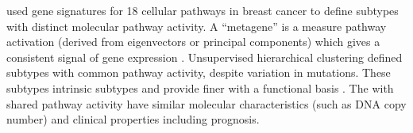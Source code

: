 \citet{Gatza2010} used gene signatures for 18 cellular \glspl{pathway} in breast cancer to define subtypes with distinct molecular \gls{pathway} activity. 
A ``\gls{metagene}'' is a measure \gls{pathway} activation (derived from eigenvectors or principal components) which gives a consistent signal of \gls{gene expression} \citep{Huang2003, Anjomshoaa2008, Nagalla2013}. %
Unsupervised hierarchical clustering defined subtypes with common \gls{pathway} activity, despite variation in \glspl{mutation}. These subtypes \glspl{intrinsic subtype} and provide finer  with a functional basis \citep{Parker2009, Gatza2014}. The  with shared \gls{pathway} activity have similar molecular characteristics (such as \acrshort{DNA} copy number) and clinical properties including prognosis.


